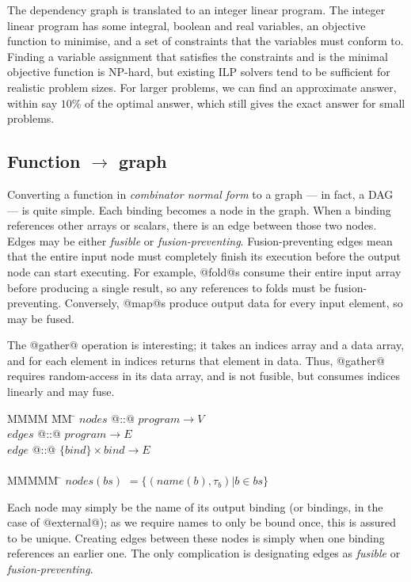The dependency graph is translated to an integer linear program.
The integer linear program has some integral, boolean and real variables, an objective function to minimise, and a set of constraints that the variables must conform to.
Finding a variable assignment that satisfies the constraints and is the minimal objective function is NP-hard, but existing ILP solvers tend to be sufficient for realistic problem sizes.
For larger problems, we can find an approximate answer, within say $10\%$ of the optimal answer, which still gives the exact answer for small problems.

\subsection{Function $\to$ graph}
Converting a function in \emph{combinator normal form} to a graph --- in fact, a DAG --- is quite simple.
Each binding becomes a node in the graph.
When a binding references other arrays or scalars, there is an edge between those two nodes.
Edges may be either \emph{fusible} or \emph{fusion-preventing}.
Fusion-preventing edges mean that the entire input node must completely finish its execution before the output node can start executing.
For example, @fold@s consume their entire input array before producing a single result, so any references to folds must be fusion-preventing.
Conversely, @map@s produce output data for every input element, so may be fused.

The @gather@ operation is interesting; it takes an indices array and a data array, and for each element in indices returns that element in data.
Thus, @gather@ requires random-access in its data array, and is not fusible, but consumes indices linearly and may fuse.

\begin{tabbing}
MMMM        \= MM   \= \kill
$nodes$     \> @::@ \> $program \to V$          \\
$edges$     \> @::@ \> $program \to E$          \\
$edge$      \> @::@ \> $\{bind\} \times bind \to E$\\
\\
MMMMM       \= \kill
$nodes(bs)$ \> $= \{(name(b), \tau_b) | b \in bs\}$       \\
\end{tabbing}
Each node may simply be the name of its output binding (or bindings, in the case of @external@); as we require names to only be bound once, this is assured to be unique.
Creating edges between these nodes is simply when one binding references an earlier one. The only complication is designating edges as \emph{fusible} or \emph{fusion-preventing}.

